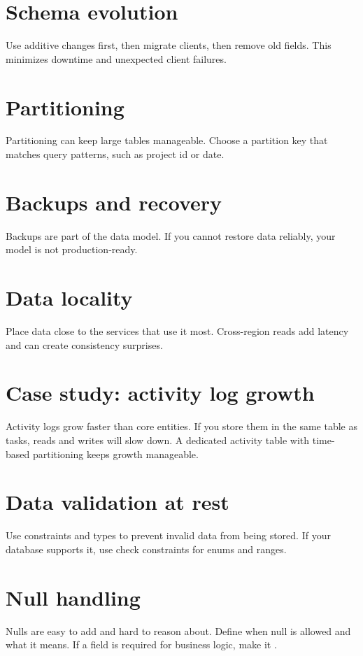 \section{Schema evolution}
Use additive changes first, then migrate clients, then remove old fields.
This minimizes downtime and unexpected client failures.

\section{Partitioning}
Partitioning can keep large tables manageable.
Choose a partition key that matches query patterns, such as project id or date.

\section{Backups and recovery}
Backups are part of the data model.
If you cannot restore data reliably, your model is not production-ready.

\section{Data locality}
Place data close to the services that use it most.
Cross-region reads add latency and can create consistency surprises.

\section{Case study: activity log growth}
Activity logs grow faster than core entities.
If you store them in the same table as tasks, reads and writes will slow down.
A dedicated activity table with time-based partitioning keeps growth manageable.

\section{Data validation at rest}
Use constraints and types to prevent invalid data from being stored.
If your database supports it, use check constraints for enums and ranges.

\section{Null handling}
Nulls are easy to add and hard to reason about.
Define when null is allowed and what it means.
If a field is required for business logic, make it .

